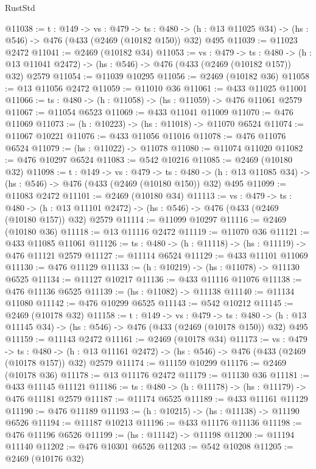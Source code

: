 \begin{lexlean}{RustStd}
\begin{coremodule}
@11038 := {t : @149} ->
  {vs : @479} ->
  {ts : @480} -> (h : @13 @11025 @34) -> (hs : @546) -> @476 (@433 (@2469 (@10182 @150)) @32) @495
@11039 := @11023 @2472
@11041 := @2469 (@10182 @34)
@11053 := {vs : @479} ->
  {ts : @480} ->
  (h : @13 @11041 @2472) -> (hs : @546) -> @476 (@433 (@2469 (@10182 @157)) @32) @2579
@11054 := @11039 @10295
@11056 := @2469 (@10182 @36)
@11058 := @13 @11056 @2472
@11059 := @11010 @36
@11061 := @433 @11025 @11001
@11066 := {ts : @480} -> (h : @11058) -> (hs : @11059) -> @476 @11061 @2579
@11067 := @11054 @6523
@11069 := @433 @11041 @11009
@11070 := @476 @11069
@11073 := (h : @10223) -> (hs : @11018) -> @11070 @6524
@11074 := @11067 @10221
@11076 := @433 @11056 @11016
@11078 := @476 @11076 @6524
@11079 := (hs : @11022) -> @11078
@11080 := @11074 @11020
@11082 := @476 @10297 @6524
@11083 := @542 @10216
@11085 := @2469 (@10180 @32)
@11098 := {t : @149} ->
  {vs : @479} ->
  {ts : @480} -> (h : @13 @11085 @34) -> (hs : @546) -> @476 (@433 (@2469 (@10180 @150)) @32) @495
@11099 := @11083 @2472
@11101 := @2469 (@10180 @34)
@11113 := {vs : @479} ->
  {ts : @480} ->
  (h : @13 @11101 @2472) -> (hs : @546) -> @476 (@433 (@2469 (@10180 @157)) @32) @2579
@11114 := @11099 @10297
@11116 := @2469 (@10180 @36)
@11118 := @13 @11116 @2472
@11119 := @11070 @36
@11121 := @433 @11085 @11061
@11126 := {ts : @480} -> (h : @11118) -> (hs : @11119) -> @476 @11121 @2579
@11127 := @11114 @6524
@11129 := @433 @11101 @11069
@11130 := @476 @11129
@11133 := (h : @10219) -> (hs : @11078) -> @11130 @6525
@11134 := @11127 @10217
@11136 := @433 @11116 @11076
@11138 := @476 @11136 @6525
@11139 := (hs : @11082) -> @11138
@11140 := @11134 @11080
@11142 := @476 @10299 @6525
@11143 := @542 @10212
@11145 := @2469 (@10178 @32)
@11158 := {t : @149} ->
  {vs : @479} ->
  {ts : @480} -> (h : @13 @11145 @34) -> (hs : @546) -> @476 (@433 (@2469 (@10178 @150)) @32) @495
@11159 := @11143 @2472
@11161 := @2469 (@10178 @34)
@11173 := {vs : @479} ->
  {ts : @480} ->
  (h : @13 @11161 @2472) -> (hs : @546) -> @476 (@433 (@2469 (@10178 @157)) @32) @2579
@11174 := @11159 @10299
@11176 := @2469 (@10178 @36)
@11178 := @13 @11176 @2472
@11179 := @11130 @36
@11181 := @433 @11145 @11121
@11186 := {ts : @480} -> (h : @11178) -> (hs : @11179) -> @476 @11181 @2579
@11187 := @11174 @6525
@11189 := @433 @11161 @11129
@11190 := @476 @11189
@11193 := (h : @10215) -> (hs : @11138) -> @11190 @6526
@11194 := @11187 @10213
@11196 := @433 @11176 @11136
@11198 := @476 @11196 @6526
@11199 := (hs : @11142) -> @11198
@11200 := @11194 @11140
@11202 := @476 @10301 @6526
@11203 := @542 @10208
@11205 := @2469 (@10176 @32)

\end{coremodule}
\end{lexlean}
